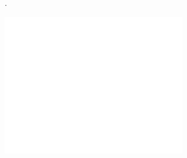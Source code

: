 
\pagecolor{black}
.
\vspace{4cm}
\begin{center}
  \includegraphics[width=0.6\textwidth]{../general/logo.pdf}
\end{center}

\vspace*{2cm}
\begin{center}
  {\color{white} \Huge\docTitle}
\end{center}

\vspace*{1cm}
\begin{center}
  {\color{white} \Huge\productName}
\end{center}

\begin{center}
  {\color{white} \Huge\docSubTitle}
\end{center}

\afterpage{\nopagecolor}
\newpage

